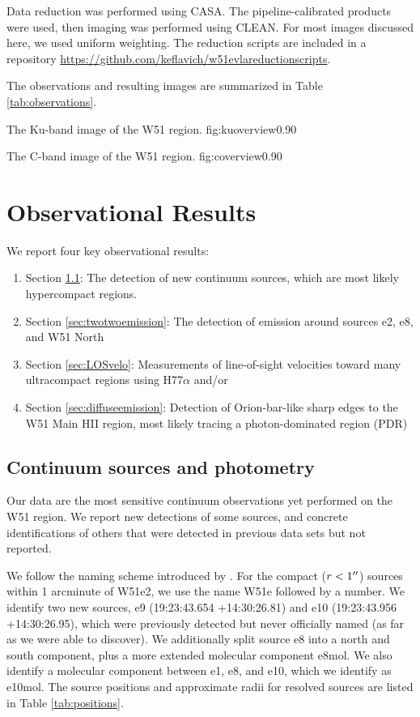 Data reduction was performed using CASA.  The pipeline-calibrated products were
used, then imaging was performed using CLEAN.  For most images discussed here, we
used uniform weighting.  The reduction scripts are included in a repository
\url{https://github.com/keflavich/w51evlareductionscripts}.

The observations and resulting images are summarized in Table
\ref{tab:observations}.




{The Ku-band image of the W51 region.}
{fig:kuoverview}{0.9}{0}

{The C-band image of the W51 region.}
{fig:coverview}{0.9}{0}

\section{Observational Results}
We report four key observational results: 
\begin{enumerate}
    \item Section \ref{sec:pointsources}: The detection of new continuum
        sources, which are most likely hypercompact \hii regions. 
    \item Section \ref{sec:twotwoemission}: The detection of \formaldehyde
        \twotwo emission around sources e2, e8, and W51 North
    \item Section \ref{sec:LOSvelo}: Measurements of line-of-sight velocities
        toward many ultracompact \hii regions using H77$\alpha$ and/or
        \formaldehyde
    \item Section \ref{sec:diffuseemission}: Detection of Orion-bar-like sharp
        edges to the W51 Main HII region, most likely tracing a
        photon-dominated region (PDR)
\end{enumerate}

\subsection{Continuum sources and photometry}
\label{sec:pointsources}
Our data are the most sensitive continuum observations yet performed on the W51
region.  We report new detections of some sources, and concrete identifications
of others that were detected in previous data sets but not reported.

We follow the naming scheme introduced by \citet{Mehringer1994a}.  For the
compact ($r<1\mbox{$^{\prime\prime}$}$) sources within 1 arcminute of W51e2, we use the name
W51e followed by a number.  We identify two new sources, e9 (19:23:43.654
+14:30:26.81) and e10 (19:23:43.956 +14:30:26.95), which were previously
detected but never officially named (as far as we were able to discover).
We additionally split source e8 into a north and south component, plus a more
extended molecular component e8mol.  We also identify a molecular component
between e1, e8, and e10, which we identify as e10mol.  The source positions
and approximate radii for resolved sources are listed in Table
\ref{tab:positions}.

